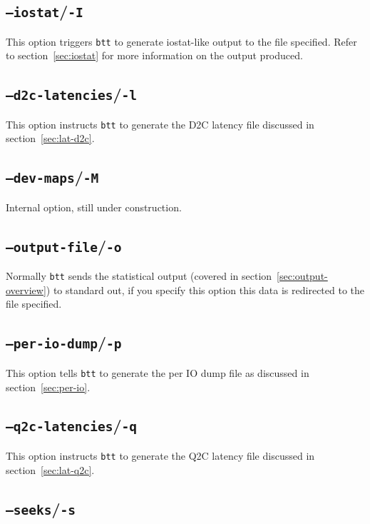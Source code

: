 \documentclass{article}
\begin{document}
\subsection{\label{sec:o-I}\texttt{--iostat}/\texttt{-I}}

  This option triggers \texttt{btt} to generate iostat-like output to the
  file specified. Refer to section~\ref{sec:iostat} for more information
  on the output produced.

\subsection{\label{sec:o-l}\texttt{--d2c-latencies}/\texttt{-l}}

  This option instructs \texttt{btt} to generate the D2C latency file
  discussed in section~\ref{sec:lat-d2c}.

\subsection{\label{sec:o-M}\texttt{--dev-maps}/\texttt{-M}}

  Internal option, still under construction.

\subsection{\label{sec:o-o}\texttt{--output-file}/\texttt{-o}}

  Normally \texttt{btt} sends the statistical output (covered in
  section~\ref{sec:output-overview}) to standard out, if you specify
  this option this data is redirected to the file specified.

\subsection{\label{sec:o-p}\texttt{--per-io-dump}/\texttt{-p}}

  This option tells \texttt{btt} to generate the per IO dump file as
  discussed in section~\ref{sec:per-io}.

\subsection{\label{sec:o-q}\texttt{--q2c-latencies}/\texttt{-q}}

  This option instructs \texttt{btt} to generate the Q2C latency file
  discussed in section~\ref{sec:lat-q2c}.

\subsection{\label{sec:o-s}\texttt{--seeks}/\texttt{-s}}
\end{document}
